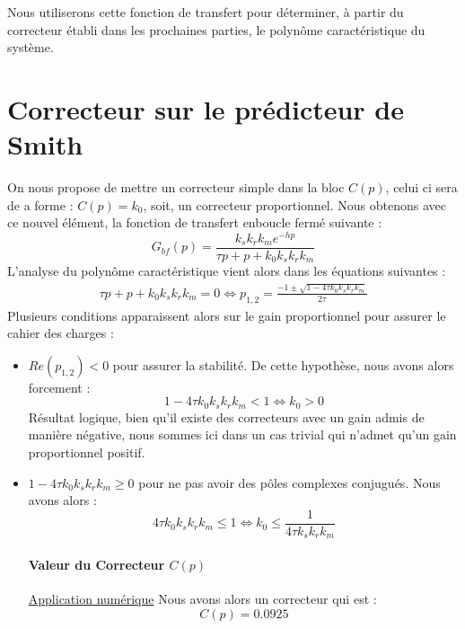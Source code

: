 Nous utiliserons cette fonction de transfert pour déterminer, à partir du correcteur établi dans les prochaines parties, le polynôme caractéristique du système. 

\section{Correcteur sur le prédicteur de Smith}
On nous propose de mettre un correcteur simple dans la bloc $C(p)$, celui ci sera de a forme : $C(p) = k_0$, soit, un correcteur proportionnel. Nous obtenons avec ce nouvel élément, la fonction de transfert enboucle fermé suivante :
\begin{equation}
G_{bf}(p) = \frac{k_sk_rk_me^{-hp}}{\tau p +p+k_0k_sk_rk_m}
\end{equation}
L'analyse du polynôme caractéristique vient alors dans les équations suivantes :
\begin{align*}
\tau p + p + k_0k_sk_rk_m = 0 \Leftrightarrow p_{1,2} = \frac{-1 \pm \sqrt{1-4\tau k_0k_sk_rk_m}}{2\tau}
\end{align*}
Plusieurs conditions apparaissent alors sur le gain proportionnel pour assurer le cahier des charges : \begin{itemize}
\item [\textbullet]$Re(p_{1,2}) < 0$ pour assurer la stabilité. De cette hypothèse, nous avons alors forcement :\begin{equation}
1-4\tau k_0k_sk_rk_m < 1 \Leftrightarrow k_0 > 0
\end{equation}
Résultat logique, bien qu'il existe des correcteurs avec un gain admis de manière négative, nous sommes ici dans un cas trivial qui n'admet qu'un gain proportionnel positif.
\item [\textbullet] $1-4\tau k_0k_sk_rk_m \geq 0$ pour ne pas avoir des pôles complexes conjugués. Nous avons alors :
\begin{equation}
4\tau k_0k_sk_rk_m \leq 1 \Leftrightarrow k_0 \leq \frac{1}{4\tau k_sk_rk_m}
\end{equation}
\paragraph*{Valeur du Correcteur $C(p)$} \underline{Application numérique} Nous avons alors un correcteur qui est : \begin{equation}\label{eqn:corPredicteurSmith}
C(p) = 0.0925
\end{equation}
\end{itemize}

